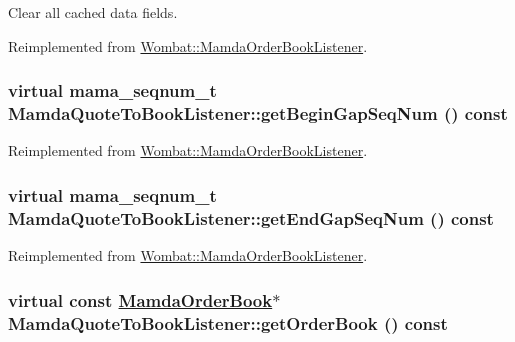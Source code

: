Clear all cached data fields. 



Reimplemented from \hyperlink{classWombat_1_1MamdaOrderBookListener_9dfecc38256b4bbe71ab35c58cc5ef1a}{Wombat::Mamda\-Order\-Book\-Listener}.\hypertarget{classMamdaQuoteToBookListener_92174a71081aee1456debac14ad05cf6}{
\subsubsection[getBeginGapSeqNum]{\setlength{\rightskip}{0pt plus 5cm}virtual mama\_\-seqnum\_\-t Mamda\-Quote\-To\-Book\-Listener::get\-Begin\-Gap\-Seq\-Num () const}}
\label{classMamdaQuoteToBookListener_92174a71081aee1456debac14ad05cf6}




Reimplemented from \hyperlink{classWombat_1_1MamdaOrderBookListener_967ffb9c9c1cd0def13fefed413ad554}{Wombat::Mamda\-Order\-Book\-Listener}.\hypertarget{classMamdaQuoteToBookListener_a40dd460d8463a312bba66e4b689d27e}{
\subsubsection[getEndGapSeqNum]{\setlength{\rightskip}{0pt plus 5cm}virtual mama\_\-seqnum\_\-t Mamda\-Quote\-To\-Book\-Listener::get\-End\-Gap\-Seq\-Num () const}}
\label{classMamdaQuoteToBookListener_a40dd460d8463a312bba66e4b689d27e}




Reimplemented from \hyperlink{classWombat_1_1MamdaOrderBookListener_c53f97e362bed788ac8daf00c2c8daf3}{Wombat::Mamda\-Order\-Book\-Listener}.\hypertarget{classMamdaQuoteToBookListener_e63faf479027ccc1c72b156847832c9d}{
\subsubsection[getOrderBook]{\setlength{\rightskip}{0pt plus 5cm}virtual const \hyperlink{classWombat_1_1MamdaOrderBook}{Mamda\-Order\-Book}$\ast$ Mamda\-Quote\-To\-Book\-Listener::get\-Order\-Book () const}}
\label{classMamdaQuoteToBookListener_e63faf479027ccc1c72b156847832c9d}




